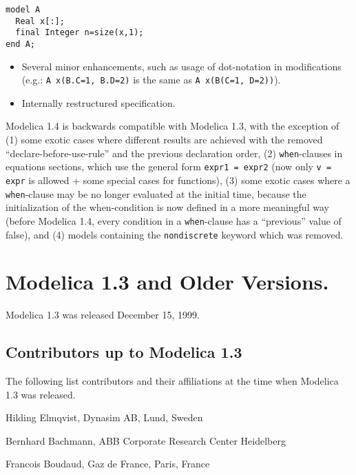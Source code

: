 \begin{lstlisting}[language=modelica]
model A
  Real x[:];
  final Integer n=size(x,1);
end A;
\end{lstlisting}

\begin{itemize}
\item
  Several minor enhancements, such as usage of dot-notation in
  modifications\\
  (e.g.: \lstinline!A x(B.C=1, B.D=2)! is the same as \lstinline!A x(B(C=1, D=2))!).
\item
  Internally restructured specification.
\end{itemize}

Modelica 1.4 is backwards compatible with Modelica 1.3, with the exception of (1) some exotic cases where different results are achieved with the removed ``declare-before-use-rule'' and the previous declaration order, (2) \lstinline!when!-clauses in equations sections, which use the general form \lstinline!expr1 = expr2! (now only \lstinline!v = expr! is allowed + some special cases for functions), (3) some exotic cases where a \lstinline!when!-clause may be no longer evaluated at the initial time, because the initialization of the when-condition is now defined in a more meaningful way (before Modelica 1.4, every condition in a \lstinline!when!-clause has a ``previous'' value of false), and (4) models containing the \lstinline[morekeywords={[2]{nondiscrete}}]!nondiscrete! keyword which was removed.

\section{Modelica 1.3 and Older Versions.}\label{modelica-1-3-and-older-versions}

Modelica 1.3 was released December 15, 1999.

\subsection{Contributors up to Modelica 1.3}\label{contributors-up-to-modelica-1-3}

The following list contributors and their affiliations at the time when Modelica 1.3 was released.

Hilding Elmqvist, Dynasim AB, Lund, Sweden

Bernhard Bachmann, ABB Corporate Research Center Heidelberg

Francois Boudaud, Gaz de France, Paris, France

